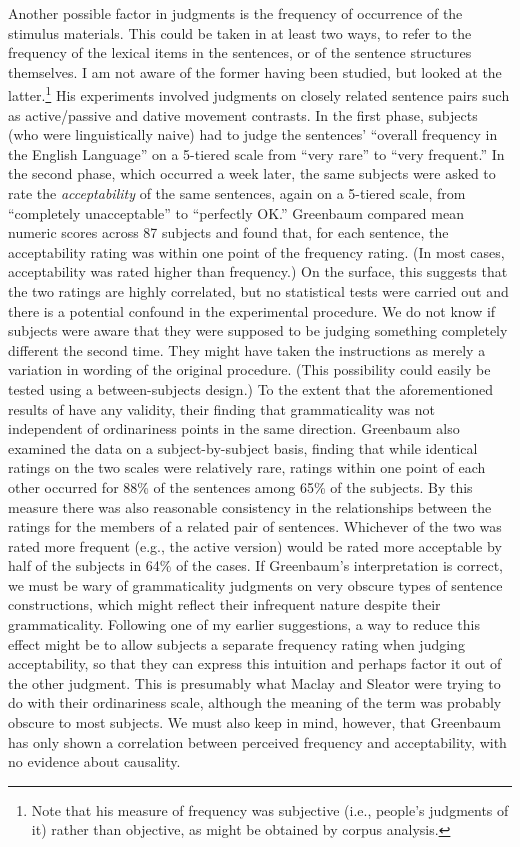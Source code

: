 Another possible factor in judgments is the frequency of occurrence of the stimulus materials. This could be taken in at least two ways, to refer to the frequency of the lexical items in the sentences, or of the sentence structures themselves. I am not aware of the former having been studied, but \citet{Greenbaum1976b,Greenbaum1977b} looked at the latter.\footnote{Note that his measure of frequency was subjective (i.e., people's judgments of it) rather than objective, as might be obtained by corpus analysis.
}
His experiments involved judgments on closely related sentence pairs such as active/passive and dative movement contrasts. In the first phase, subjects (who were linguistically naive) had to judge the sentences' ``overall frequency in the English Language'' on a 5-tiered scale from ``very rare'' to ``very frequent.'' In the second phase, which occurred a week later, the same subjects were asked to rate the \textit{acceptability} of the same sentences, again on a 5-tiered scale, from ``completely unacceptable'' to ``perfectly OK.'' Greenbaum compared mean numeric scores across 87 subjects and found that, for each sentence, the acceptability rating was within one point of the frequency rating. (In most cases, acceptability was rated higher than frequency.) On the surface, this suggests that the two ratings are highly correlated, but no statistical tests were carried out and there is a potential confound in the experimental procedure. We do not know if subjects were aware that they were supposed to be judging something completely different the second time. They might have taken the instructions as merely a variation in wording of the original procedure. (This possibility could easily be tested using a between-subjects design.) To the extent that the aforementioned results of  \citet{VetterEtAl1979} have any validity, their finding that grammaticality was not independent of ordinariness points in the same direction. Greenbaum also examined the data on a subject-by-subject basis, finding that while identical ratings on the two scales were relatively rare, ratings
within one point of each other occurred for 88\% of the sentences among 65\% of the subjects. By this measure there was also reasonable consistency in the relationships between the ratings for the members of a related pair of sentences. Whichever of the two was rated more frequent (e.g., the active version) would be rated more acceptable by half of the subjects in 64\% of the cases. If Greenbaum's interpretation is correct, we must be wary of grammaticality judgments on very obscure types of sentence constructions, which might reflect their infrequent nature despite their grammaticality. Following one of my earlier suggestions, a way to reduce this effect might be to allow subjects a separate frequency rating when judging acceptability, so that they can express this intuition and perhaps factor it out of the other judgment. This is presumably what Maclay and Sleator were trying to do with their ordinariness scale, although the meaning of the term was probably obscure to most subjects. We must also keep in mind, however, that Greenbaum has only shown a correlation between perceived frequency and acceptability, with no evidence about causality.

